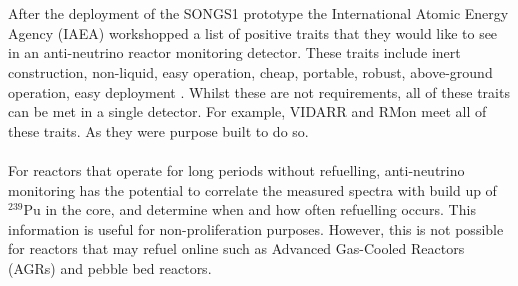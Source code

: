 \\\\After the deployment of the SONGS1 prototype the International Atomic Energy Agency (IAEA) workshopped a list of positive traits that they would like to see in an anti-neutrino reactor monitoring detector. These traits include inert construction, non-liquid, easy operation, cheap, portable, robust, above-ground operation, easy deployment \cite{IAEA_2008}. Whilst these are not requirements, all of these traits can be met in a single detector. For example, VIDARR and RMon meet all of these traits. As they were purpose built to do so. 
\\\\For reactors that operate for long periods without refuelling, anti-neutrino monitoring has the potential to correlate the measured spectra with build up of $^{239}$Pu in the core, and determine when and how often refuelling occurs. This information is useful for non-proliferation purposes. However, this is not possible for reactors that may refuel online such as Advanced Gas-Cooled Reactors (AGRs) and pebble bed reactors.

